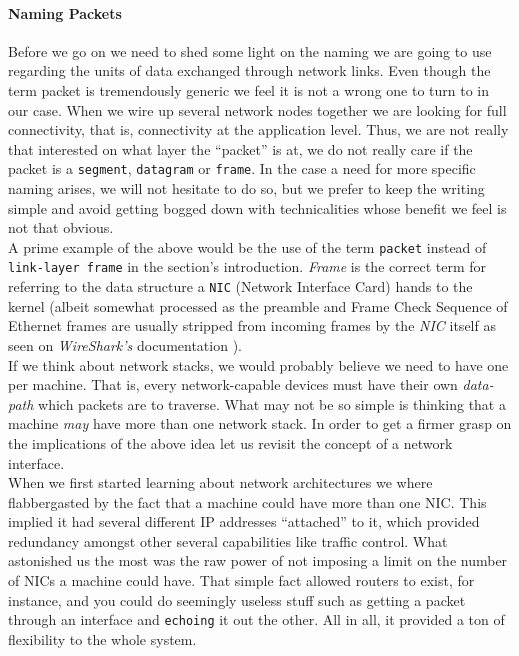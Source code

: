          \paragraph{Naming Packets}
            Before we go on we need to shed some light on the naming we are going to use regarding the units of data exchanged through network links. Even though the term packet is tremendously generic we feel it is not a wrong one to turn to in our case. When we wire up several network nodes together we are looking for full connectivity, that is, connectivity at the application level. Thus, we are not really that interested on what layer the ``packet'' is at, we do not really care if the packet is a \texttt{segment}, \texttt{datagram} or \texttt{frame}. In the case a need for more specific naming arises, we will not hesitate to do so, but we prefer to keep the writing simple and avoid getting bogged down with technicalities whose benefit we feel is not that obvious.\\

            A prime example of the above would be the use of the term \texttt{packet} instead of \texttt{link-layer frame} in the section's introduction. \textit{Frame} is the correct term for referring to the data structure a \texttt{NIC} (Network Interface Card) hands to the kernel (albeit somewhat processed as the preamble and Frame Check Sequence of Ethernet frames are usually stripped from incoming frames by the \textit{NIC} itself as seen on \textit{WireShark's} documentation \cite{bib:wirehsark-eth-doc}).\\

        If we think about network stacks, we would probably believe we need to have one per machine. That is, every network-capable devices must have their own \textit{data-path} which packets are to traverse. What may not be so simple is thinking that a machine \textit{may} have more than one network stack. In order to get a firmer grasp on the implications of the above idea let us revisit the concept of a network interface.\\

        When we first started learning about network architectures we where flabbergasted by the fact that a machine could have more than one NIC. This implied it had several different IP addresses ``attached'' to it, which provided redundancy amongst other several capabilities like traffic control. What astonished us the most was the raw power of not imposing a limit on the number of NICs a machine could have. That simple fact allowed routers to exist, for instance, and you could do seemingly useless stuff such as getting a packet through an interface and \texttt{echoing} it out the other. All in all, it provided a ton of flexibility to the whole system.\\

